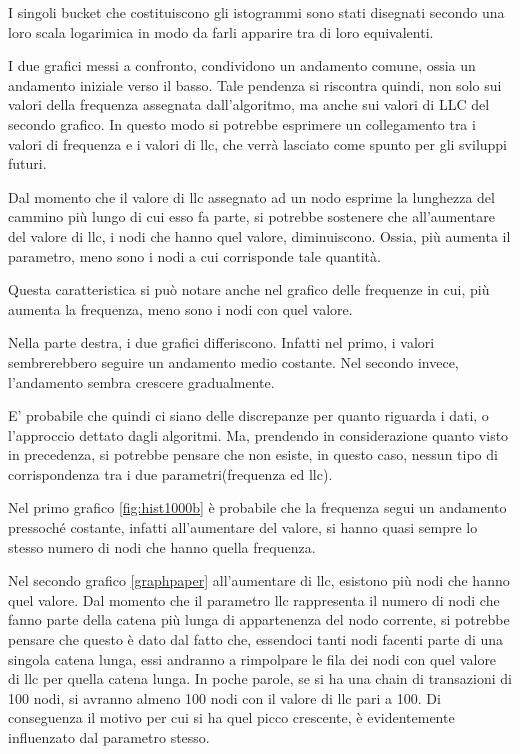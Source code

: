 I singoli bucket che costituiscono gli istogrammi sono stati disegnati secondo una loro scala logarimica in modo da farli apparire tra di loro equivalenti. 

I due grafici messi a confronto, condividono un andamento comune, ossia un andamento iniziale verso il basso. Tale pendenza si riscontra quindi, non solo sui valori della frequenza assegnata dall'algoritmo, ma anche sui valori di LLC del secondo grafico. In questo modo si potrebbe esprimere un collegamento tra i valori di frequenza e i valori di llc, che verrà lasciato come spunto per gli sviluppi futuri.

Dal momento che il valore di llc assegnato ad un nodo esprime la lunghezza del cammino più lungo di cui esso fa parte, si potrebbe sostenere che all'aumentare del valore di llc, i nodi che hanno quel valore, diminuiscono. Ossia, più aumenta il parametro, meno sono i nodi a cui corrisponde tale quantità.

Questa caratteristica si può notare anche nel grafico delle frequenze in cui, più aumenta la frequenza, meno sono i nodi con quel valore.

Nella parte destra, i due grafici differiscono. Infatti nel primo, i valori sembrerebbero seguire un andamento medio costante. Nel secondo invece, l'andamento sembra crescere gradualmente. 

E' probabile che quindi ci siano delle discrepanze per quanto riguarda i dati, o l'approccio dettato dagli algoritmi. Ma, prendendo in considerazione quanto visto in precedenza, si potrebbe pensare che non esiste, in questo caso, nessun tipo di corrispondenza tra i due parametri(frequenza ed llc).

Nel primo grafico \ref{fig:hist1000b} è probabile che la frequenza segui un andamento pressoché costante, infatti all'aumentare del valore, si hanno quasi sempre lo stesso numero di nodi che hanno quella frequenza.

Nel secondo grafico \ref{graphpaper} all'aumentare di llc, esistono più nodi che hanno quel valore. Dal momento che il parametro llc rappresenta il numero di nodi che fanno parte della catena più lunga di appartenenza del nodo corrente, si potrebbe pensare che questo è dato dal fatto che, essendoci tanti nodi facenti parte di una singola catena lunga, essi andranno a rimpolpare le fila dei nodi con quel valore di llc per quella catena lunga. In poche parole, se si ha una chain di transazioni di 100 nodi, si avranno almeno 100 nodi con il valore di llc pari a 100. Di conseguenza il motivo per cui si ha quel picco crescente, è evidentemente influenzato dal parametro stesso.

